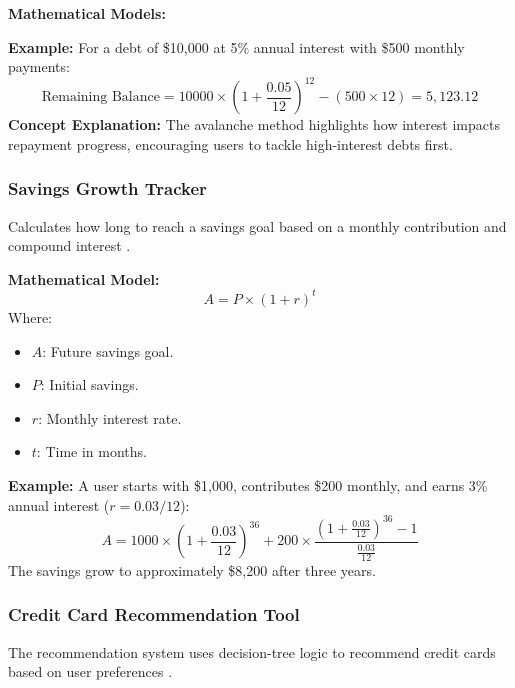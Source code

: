 \documentclass[11pt,twocolumn]{article}
\begin{document}
\textbf{Mathematical Models:}
\begin{itemize}
    \item \textbf{Snowball Method:} Prioritizes smaller debts:
{\scriptsize
\[
\text{Remaining Balance} = \text{Debt Principal} - (\text{Monthly Payment} \times \text{Months Paid})
\]
}
    \item \textbf{Avalanche Method:} Accounts for compounding interest:
    {\tiny
    \[
    \text{Remaining Balance} = \text{Principal} \times (1 + \frac{\text{Interest Rate}}{12})^{\text{Months}} - \text{Payments Made}
    \]
\end{itemize}

\textbf{Example:}  
For a debt of \$10,000 at 5\% annual interest with \$500 monthly payments:
   {\small
\[
\text{Remaining Balance} = 10000 \times (1 + \frac{0.05}{12})^{12} - (500 \times 12) = 5,123.12
\]
}
\textbf{Concept Explanation:}  
The avalanche method highlights how interest impacts repayment progress, encouraging users to tackle high-interest debts first.

\subsubsection{Savings Growth Tracker}
Calculates how long to reach a savings goal based on a monthly contribution and compound interest \cite{investment}.

\textbf{Mathematical Model:}
\[
A = P \times (1 + r)^t
\]
Where:
\begin{itemize}
    \item \( A \): Future savings goal.
    \item \( P \): Initial savings.
    \item \( r \): Monthly interest rate.
    \item \( t \): Time in months.
\end{itemize}

\textbf{Example:}  
A user starts with \$1,000, contributes \$200 monthly, and earns 3\% annual interest (\( r = 0.03 / 12 \)):
\[
A = 1000 \times (1 + \frac{0.03}{12})^{36} + 200 \times \frac{(1 + \frac{0.03}{12})^{36} - 1}{\frac{0.03}{12}}
\]
The savings grow to approximately \$8,200 after three years.

\subsubsection{Credit Card Recommendation Tool}
The recommendation system uses decision-tree logic to recommend credit cards based on user preferences \cite{decisiontrees}.
\end{document}
